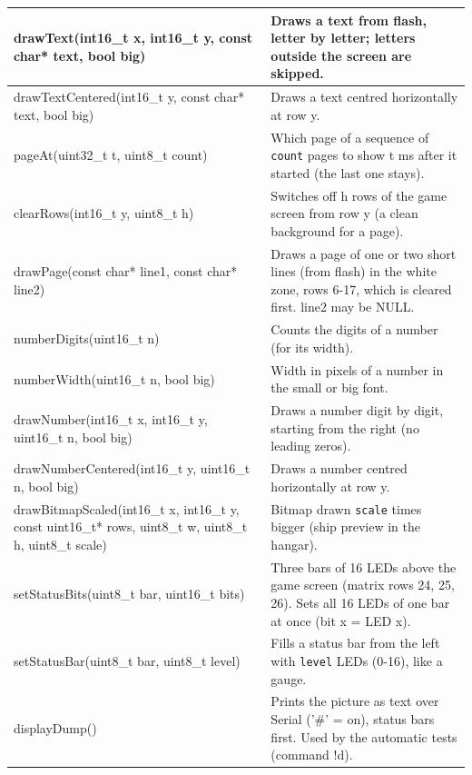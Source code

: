 \documentclass[11pt,a4paper]{article}
\begin{document}
{\begin{longtable}{|>{\raggedright\arraybackslash}p{5.82cm}|>{\raggedright\arraybackslash}p{10.68cm}|}
\rowcolor{rowshade}drawText(int16\_t x, int16\_t y, const char* text, bool big) & Draws a text from flash, letter by letter; letters outside the screen are skipped.\\\hline
drawTextCentered(int16\_t y, const char* text, bool big) & Draws a text centred horizontally at row y.\\\hline
\rowcolor{rowshade}pageAt(uint32\_t t, uint8\_t count) & Which page of a sequence of \texttt{count} pages to show t ms after it started (the last one stays).\\\hline
clearRows(int16\_t y, uint8\_t h) & Switches off h rows of the game screen from row y (a clean background for a page).\\\hline
\rowcolor{rowshade}drawPage(const char* line1, const char* line2) & Draws a page of one or two short lines (from flash) in the white zone, rows 6-17, which is cleared first. line2 may be NULL.\\\hline
numberDigits(uint16\_t n) & Counts the digits of a number (for its width).\\\hline
\rowcolor{rowshade}numberWidth(uint16\_t n, bool big) & Width in pixels of a number in the small or big font.\\\hline
drawNumber(int16\_t x, int16\_t y, uint16\_t n, bool big) & Draws a number digit by digit, starting from the right (no leading zeros).\\\hline
\rowcolor{rowshade}drawNumberCentered(int16\_t y, uint16\_t n, bool big) & Draws a number centred horizontally at row y.\\\hline
drawBitmapScaled(int16\_t x, int16\_t y, const uint16\_t* rows, uint8\_t w, uint8\_t h, uint8\_t scale) & Bitmap drawn \texttt{scale} times bigger (ship preview in the hangar).\\\hline
\rowcolor{rowshade}setStatusBits(uint8\_t bar, uint16\_t bits) & Three bars of 16 LEDs above the game screen (matrix rows 24, 25, 26). Sets all 16 LEDs of one bar at once (bit x = LED x).\\\hline
setStatusBar(uint8\_t bar, uint8\_t level) & Fills a status bar from the left with \texttt{level} LEDs (0-16), like a gauge.\\\hline
\rowcolor{rowshade}displayDump() & Prints the picture as text over Serial ('\#' = on), status bars first. Used by the automatic tests (command !d).\\\hline
\end{longtable}}
\end{document}
